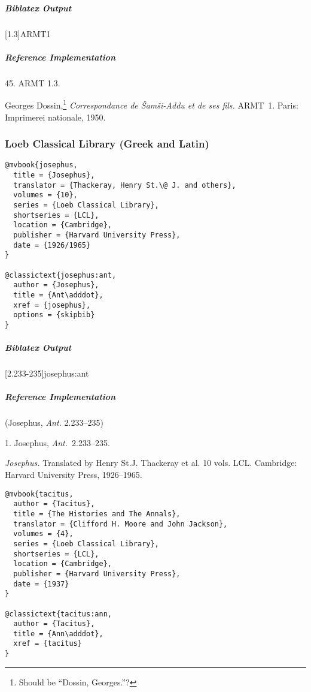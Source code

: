 \documentclass[a4paper]{article}
\newenvironment{biboutput}{%
  \subparagraph{Biblatex Output}
}{\color{black}}
\newenvironment{refimp}{%
  \subparagraph{Reference Implementation}
  \color{reference-colour}
  \rm
}{\par\color{black}}
\begin{document}
\begin{biboutput}
  [1.3]{ARMT1}
\end{biboutput}

\begin{refimp}
  \hspace*{\bibindent}45. ARMT 1.3.

  \hangindent\bibindent Georges Dossin,\footnote{Should be “Dossin,
  Georges.”?} \emph{Correspondance de Šamši-Addu et de ses fils.} ARMT~1.
  Paris: Imprimerei nationale, 1950.

\end{refimp}

\subsubsection{Loeb Classical Library (Greek and Latin)}

\begin{lstlisting}
@mvbook{josephus,
  title = {Josephus},
  translator = {Thackeray, Henry St.\@ J. and others},
  volumes = {10},
  series = {Loeb Classical Library},
  shortseries = {LCL},
  location = {Cambridge},
  publisher = {Harvard University Press},
  date = {1926/1965}
}

@classictext{josephus:ant,
  author = {Josephus},
  title = {Ant\adddot},
  xref = {josephus},
  options = {skipbib}
}
\end{lstlisting}

\begin{biboutput}
  [2.233-235]{josephus:ant}
\end{biboutput}

\begin{refimp}
  (Josephus, \emph{Ant.} 2.233–235)

  \hspace*{\bibindent}1. Josephus, \emph{Ant.}\ 2.233–235.

  \hangindent\bibindent \emph{Josephus.} Translated by Henry St.\@ J.
  Thackeray et al. 10 vols. LCL. Cambridge: Harvard University Press,
  1926–1965.

\end{refimp}

\medskip

\begin{lstlisting}
@mvbook{tacitus,
  author = {Tacitus},
  title = {The Histories and The Annals},
  translator = {Clifford H. Moore and John Jackson},
  volumes = {4},
  series = {Loeb Classical Library},
  shortseries = {LCL},
  location = {Cambridge},
  publisher = {Harvard University Press},
  date = {1937}
}

@classictext{tacitus:ann,
  author = {Tacitus},
  title = {Ann\adddot},
  xref = {tacitus}
}
\end{lstlisting}
\end{document}
